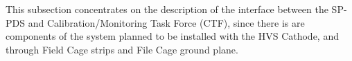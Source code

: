 




This subsection concentrates on the description of the interface between the SP-PDS and Calibration/Monitoring Task Force (CTF), since there is are components of the system planned to be installed with the HVS Cathode, and through Field Cage strips and File Cage ground plane.

